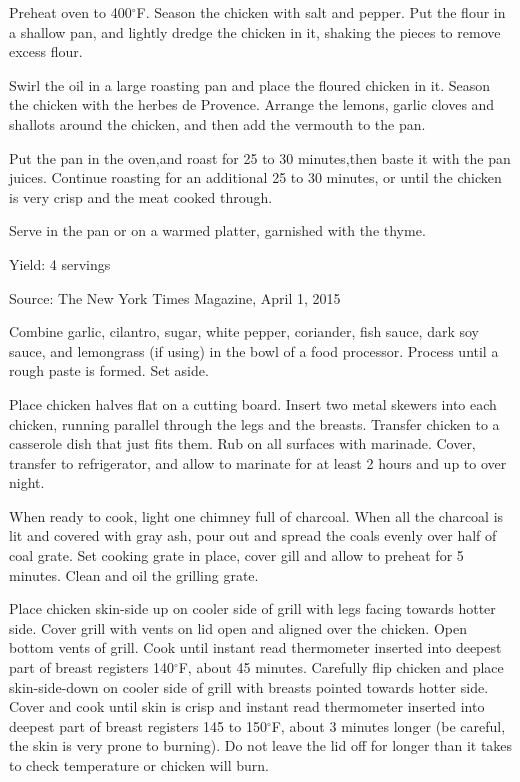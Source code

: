 \documentclass[letterpaper]{recipePMG}
\renewcommand{\deg}{$^\circ$}
\begin{document}
Preheat oven to 400\deg F. Season the chicken with salt and pepper. Put the flour in a shallow pan, and lightly dredge the chicken in it, shaking the pieces to remove excess flour.

Swirl the oil in a large roasting pan and place the floured chicken in it. Season the chicken with the herbes de Provence. Arrange the lemons, garlic cloves and shallots around the chicken, and then add the vermouth to the pan.

Put the pan in the oven,and roast for 25 to 30 minutes,then baste it with the pan juices. Continue roasting for an additional 25 to 30 minutes, or until the chicken is very crisp and the meat cooked through.

Serve in the pan or on a warmed platter, garnished with the thyme.

Yield: 4 servings

Source: The New York Times Magazine, April 1, 2015

\newpage
{}
\label{GaiYang}

Combine garlic, cilantro, sugar, white pepper, coriander, fish sauce, dark soy sauce, and lemongrass (if using) in the bowl of a food processor. Process until a rough paste is formed. Set aside.

Place chicken halves flat on a cutting board. Insert two metal skewers into each chicken, running parallel through the legs and the breasts. Transfer chicken to a casserole dish that just fits them. Rub on all surfaces with marinade. Cover, transfer to refrigerator, and allow to marinate for at least 2 hours and up to over night.

When ready to cook, light one chimney full of charcoal. When all the charcoal is lit and covered with gray ash, pour out and spread the coals evenly over half of coal grate. Set cooking grate in place, cover gill and allow to preheat for 5 minutes. Clean and oil the grilling grate.

Place chicken skin-side up on cooler side of grill with legs facing towards hotter side. Cover grill with vents on lid open and aligned over the chicken. Open bottom vents of grill. Cook until instant read thermometer inserted into deepest part of breast registers 140\deg F, about 45 minutes. Carefully flip chicken and place skin-side-down on cooler side of grill with breasts pointed towards hotter side. Cover and cook until skin is crisp and instant read thermometer inserted into deepest part of breast registers 145 to 150\deg F, about 3 minutes longer (be careful, the skin is very prone to burning). Do not leave the lid off for longer than it takes to check temperature or chicken will burn.
\end{document}
